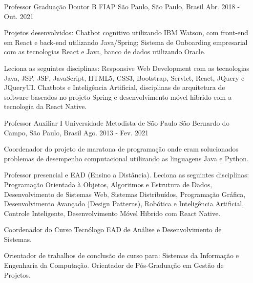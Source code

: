 

\begin{cventries}

  \cventry
    {Professor Graduação Doutor B} %
    {FIAP} %
    {São Paulo, São Paulo, Brasil} %
    {Abr. 2018 - Out. 2021} %
    {
      \begin{cvitems} %
        \item{Projetos desenvolvidos: Chatbot cognitivo utilizando IBM Watson, com front-end em React e back-end utilizando Java/Spring; Sistema de Onboarding empresarial com as tecnologias React e Java, banco de dados utilizando Oracle.}
        \item{Leciona as seguintes disciplinas: Responsive Web Development com as tecnologias Java, JSP, JSF, JavaScript, HTML5, CSS3, Bootstrap, Servlet, React, JQuery e JQueryUI. Chatbots e Inteligência Artificial, disciplinas de arquitetura de software baseados no projeto Spring e desenvolvimento móvel hibrido com a tecnologia da React Native.}
      \end{cvitems}
    }

  \cventry
    {Professor Auxiliar I} %
    {Universidade Metodista de São Paulo} %
    {São Bernardo do Campo, São Paulo, Brasil} %
    {Ago. 2013 - Fev. 2021} %
    {
      \begin{cvitems} %
        \item{Coordenador do projeto de maratona de programação onde eram solucionados problemas de desempenho computacional utilizando as linguagens Java e Python.}
        \item{Professor presencial e EAD (Ensino a Distância). Leciona as seguintes disciplinas: Programação Orientada à Objetos, Algoritmos e Estrutura de Dados, Desenvolvimento de Sistemas Web, Sistemas Distribuídos, Programação Gráfica, Desenvolvimento Avançado (Design Patterns), Robótica e Inteligência Artificial, Controle Inteligente, Desenvolvimento Móvel Hibrido com React Native.}
        \item{Coordenador do Curso Tecnólogo EAD de Análise e Desenvolvimento de Sistemas.}
        \item{Orientador de trabalhos de conclusão de curso para: Sistemas da Informação e Engenharia da Computação. Orientador de Pós-Graduação em Gestão de Projetos.}
      \end{cvitems}
    }


\end{cventries}
